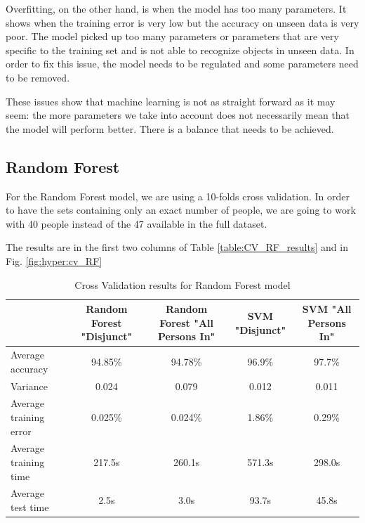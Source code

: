 \documentclass[conference]{IEEEtran}
\begin{document}
\textcolor{baptiste}{Overfitting, on the other hand, is when the model has too many parameters. It shows when the training error is very low but the accuracy on unseen data is very poor. The model picked up too many parameters or parameters that are very specific to the training set and is not able to recognize objects in unseen data. In order to fix this issue, the model needs to be regulated and some parameters need to be removed.}

\textcolor{baptiste}{These issues show that machine learning is not as straight forward as it may seem: the more parameters we take into account does not necessarily mean that the model will perform better. There is a balance that needs to be achieved.
}




\subsection{Random Forest}

\textcolor{baptiste}{For the Random Forest model, we are using a 10-folds cross validation. In order to have the sets containing only an exact number of people, we are going to work with 40 people instead of the 47 available in the full dataset.}

\textcolor{baptiste}{The results are in the first two columns of Table \ref{table:CV_RF_results} and in Fig. \ref{fig:hyper:cv_RF}}

\begin{table}[htbp]
    \color{baptiste}
    \caption{\color{baptiste}Cross Validation results for Random Forest model}
    \begin{center}
    \begin{tabular}{|l|c|c|c|c|}
        \hline
        \textbf{} & \textbf{Random Forest "Disjunct"} & \textbf{Random Forest "All Persons In"} & \textbf{SVM "Disjunct"} & \textbf{SVM "All Persons In"}\\
        \hline
        Average accuracy & 94.85\% & 94.78\% & 96.9\% & 97.7\% \\
        \hline
        Variance & 0.024 & 0.079 & 0.012 & 0.011 \\
        \hline
        Average training error & 0.025\% & 0.024\% & 1.86\% & 0.29\% \\
        \hline
        Average training time & 217.5s & 260.1s & 571.3s & 298.0s \\
        \hline
        Average test time & 2.5s & 3.0s & 93.7s & 45.8s \\
        \hline
    \end{tabular}
    \label{table:CV_results}
    \end{center}
\end{table}
\end{document}
